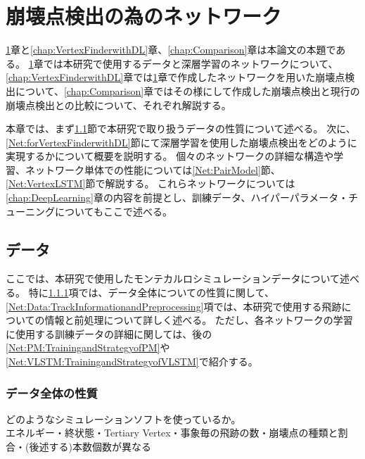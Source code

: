 
\chapter{崩壊点検出の為のネットワーク} \label{chap:Networks}

\ref{chap:Networks}章と\ref{chap:VertexFinderwithDL}章、\ref{chap:Comparison}章は本論文の本題である。
\ref{chap:Networks}章では本研究で使用するデータと深層学習のネットワークについて、\ref{chap:VertexFinderwithDL}章では\ref{chap:Networks}章で作成したネットワークを用いた崩壊点検出について、\ref{chap:Comparison}章ではその様にして作成した崩壊点検出と現行の崩壊点検出との比較について、それぞれ解説する。

本章では、まず\ref{Net:Data}節で本研究で取り扱うデータの性質について述べる。
次に、\ref{Net:forVertexFinderwithDL}節にて深層学習を使用した崩壊点検出をどのように実現するかについて概要を説明する。
個々のネットワークの詳細な構造や学習、ネットワーク単体での性能については\ref{Net:PairModel}節、\ref{Net:VertexLSTM}節で解説する。
これらネットワークについては\ref{chap:DeepLearning}章の内容を前提とし、訓練データ、ハイパーパラメータ・チューニングについてもここで述べる。

\section{データ} \label{Net:Data}

ここでは、本研究で使用したモンテカルロシミュレーションデータについて述べる。
特に\ref{Net:Data:DataProperty}項では、データ全体についての性質に関して、\ref{Net:Data:TrackInformationandPreprocessing}項では、本研究で使用する飛跡についての情報と前処理について詳しく述べる。
ただし、各ネットワークの学習に使用する訓練データの詳細に関しては、後の\ref{Net:PM:TrainingandStrategyofPM}や\ref{Net:VLSTM:TrainingandStrategyofVLSTM}で紹介する。

\subsection{データ全体の性質} \label{Net:Data:DataProperty}

どのようなシミュレーションソフトを使っているか。\\
エネルギー・終状態・Tertiary Vertex・事象毎の飛跡の数・崩壊点の種類と割合・(後述する)本数個数が異なる

